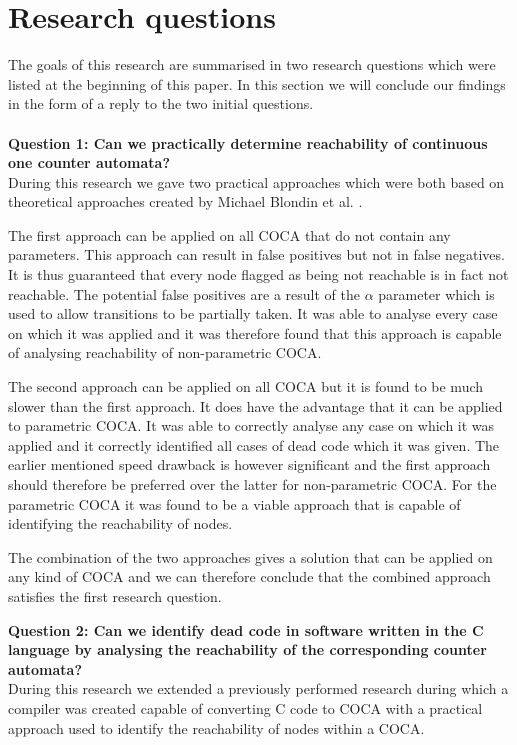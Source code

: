 \documentclass[12pt]{article}
\begin{document}
\section{Research questions}
The goals of this research are summarised in two research questions which were listed at the beginning of this paper. In this section we will conclude our findings in the form of a reply to the two initial questions.\\
\\
\noindent
\textbf{Question 1: Can we practically determine reachability of continuous one counter automata?}\\
During this research we gave two practical approaches which were both based on theoretical approaches created by Michael Blondin et al. \cite{blondin2021continuous}. 

The first approach can be applied on all COCA that do not contain any parameters. This approach can result in false positives but not in false negatives. It is thus guaranteed that every node flagged as being not reachable is in fact not reachable. The potential false positives are a result of the $\alpha$ parameter which is used to allow transitions to be partially taken. It was able to analyse every case on which it was applied and it was therefore found that this approach is capable of analysing reachability of non-parametric COCA.

The second approach can be applied on all COCA but it is found to be much slower than the first approach. It does have the advantage that it can be applied to parametric COCA. It was able to correctly analyse any case on which it was applied and it correctly identified all cases of dead code which it was given. The earlier mentioned speed drawback is however significant and the first approach should therefore be preferred over the latter for non-parametric COCA. For the parametric COCA it was found to be a viable approach that is capable of identifying the reachability of nodes.

The combination of the two approaches gives a solution that can be applied on any kind of COCA and we can therefore conclude that the combined approach satisfies the first research question.

\noindent
\textbf{Question 2: Can we identify dead code in software written in the C language by analysing the reachability of the corresponding counter automata? } \\
During this research we extended a previously performed research during which a compiler was created capable of converting C code to COCA with a practical approach used to identify the reachability of nodes within a COCA.
\end{document}
